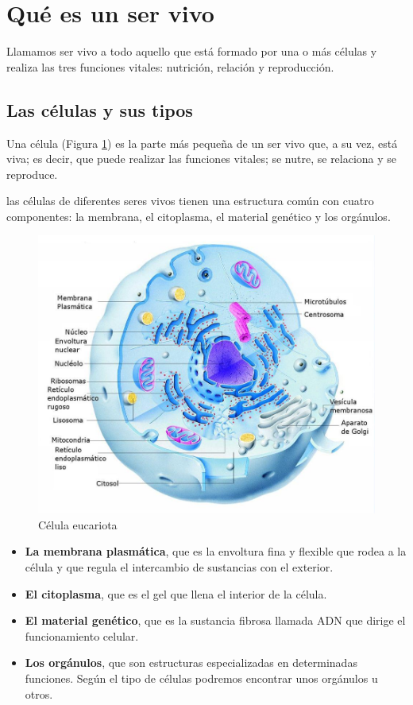 \section{Qué es un ser vivo}

Llamamos ser vivo a todo aquello que está formado por una o más células y realiza las tres funciones vitales: nutrición, relación y reproducción.

\subsection{Las células y sus tipos}
Una célula  (Figura \ref{fig:celula-eucariota}) es la parte más pequeña de un ser vivo que, a su vez, está viva; es decir, que puede realizar las funciones vitales; se nutre, se relaciona y se reproduce.

\vspace{3mm}
las células de diferentes seres vivos tienen una estructura común con cuatro componentes: la membrana, el citoplasma, el material genético y los orgánulos.

\begin{figure}[ht]
    \centering
    \includegraphics[width=0.7\linewidth]{Tema1/02_Celula_eucariota.jpg}
    \caption{Célula eucariota}
    \label{fig:celula-eucariota}
\end{figure}

\begin{itemize}
    \item \textbf{La membrana plasmática}, que es la envoltura fina y flexible que rodea a la célula y que regula el intercambio de sustancias con el exterior.
    \item \textbf{El citoplasma}, que es el gel que llena el interior de la célula.
    \item \textbf{El material genético}, que es la sustancia fibrosa llamada ADN que dirige el funcionamiento celular.
    \item \textbf{Los orgánulos}, que son estructuras especializadas en determinadas funciones. Según el tipo de células podremos encontrar unos orgánulos u otros.
\end{itemize}

